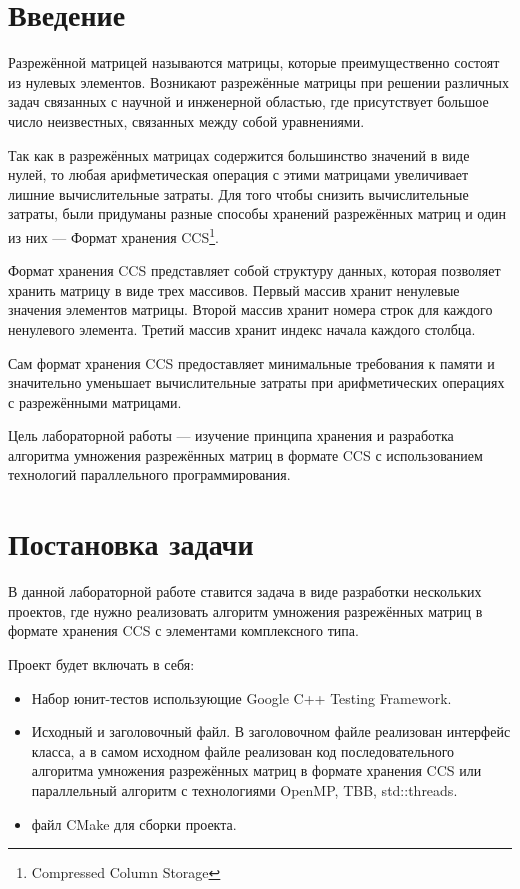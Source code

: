 \documentclass{report}
\begin{document}
	\section*{Введение}
	
	Разрежённой матрицей называются матрицы, которые преимущественно состоят из нулевых элементов. Возникают разрежённые матрицы при решении различных задач связанных с научной и инженерной областью, где присутствует большое число неизвестных, связанных между собой уравнениями.
	\par Так как в разрежённых матрицах содержится большинство значений в виде нулей, то любая арифметическая операция с этими матрицами увеличивает лишние вычислительные затраты. Для того чтобы снизить вычислительные затраты, были придуманы разные способы хранений разрежённых матриц и один из них --- Формат хранения CCS\footnote{Compressed Column Storage}. 
	\par Формат хранения CCS представляет собой структуру данных, которая позволяет хранить матрицу в виде трех массивов. Первый массив хранит ненулевые значения элементов матрицы. Второй массив хранит номера строк для каждого ненулевого элемента. Третий массив хранит индекс начала каждого столбца.
	\par Сам формат хранения CCS предоставляет минимальные требования к памяти и значительно уменьшает вычислительные затраты при арифметических операциях с разрежёнными матрицами.
	\par Цель лабораторной работы --- изучение принципа хранения и разработка алгоритма умножения разрежённых матриц в формате CCS с использованием технологий параллельного программирования.
	\newpage
	
	\section*{Постановка задачи}
	В данной лабораторной работе ставится задача в виде разработки нескольких проектов, где нужно реализовать алгоритм умножения разрежённых матриц в формате хранения CCS с элементами комплексного типа.
	\par Проект будет включать в себя:
	\begin{itemize}
		\item Набор юнит-тестов использующие Google C++ Testing Framework.
		\item Исходный и заголовочный файл. В заголовочном файле реализован интерфейс класса, а в самом исходном файле реализован код последовательного алгоритма умножения разрежённых матриц в формате хранения CCS или параллельный алгоритм с технологиями OpenMP, TBB, std::threads.
		\item файл CMake для сборки проекта.
	\end{itemize}
	\newpage
	
\end{document}
